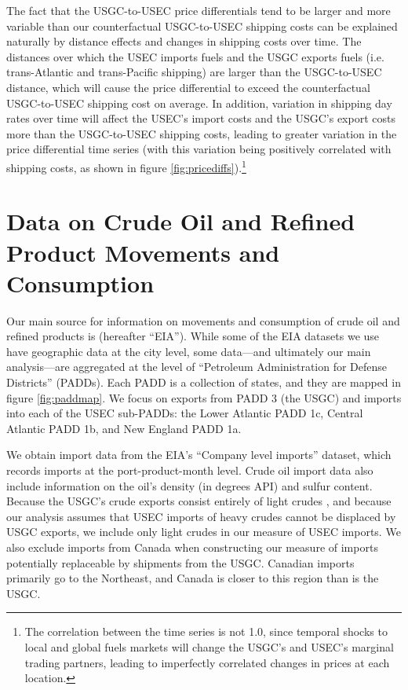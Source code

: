 \documentclass[12pt]{article}
\begin{document}
The fact that the USGC-to-USEC price differentials tend to be larger and more variable than our counterfactual USGC-to-USEC shipping costs can be explained naturally by distance effects and changes in shipping costs over time. The distances over which the USEC imports fuels and the USGC exports fuels (i.e. trans-Atlantic and trans-Pacific shipping) are larger than the USGC-to-USEC distance, which will cause the price differential to exceed the counterfactual USGC-to-USEC shipping cost on average. In addition, variation in shipping day rates over time will affect the USEC’s import costs and the USGC’s export costs more than the USGC-to-USEC shipping costs, leading to greater variation in the price differential time series (with this variation being positively correlated with shipping costs, as shown in figure \ref{fig:pricediffs}).\footnote{The correlation between the time series is not 1.0, since temporal shocks to local and global fuels markets will change the USGC’s and USEC’s marginal trading partners, leading to imperfectly correlated changes in prices at each location.}


\section{Data on Crude Oil and Refined Product Movements and Consumption \label{sec:flowdata}}

Our main source for information on movements and consumption of crude oil and refined products is \citet{EIApetroleum} (hereafter ``EIA''). While some of the EIA datasets we use have geographic data at the city level, some data---and ultimately our main analysis---are aggregated at the level of ``Petroleum Administration for Defense Districts'' (PADDs). Each PADD is a collection of states, and they are mapped in figure \ref{fig:paddmap}. We focus on exports from PADD 3 (the USGC) and imports into each of the USEC sub-PADDs: the Lower Atlantic PADD 1c, Central Atlantic PADD 1b, and New England PADD 1a.

We obtain import data from the EIA's ``Company level imports'' dataset, which records imports at the port-product-month level. Crude oil import data also include information on the oil's density (in degrees API) and sulfur content. Because the USGC's crude exports consist entirely of light crudes \citep{SPglobal_exports_2018}, and because our analysis assumes that USEC imports of heavy crudes cannot be displaced by USGC exports, we include only light crudes in our measure of USEC imports. We also exclude imports from Canada when constructing our measure of imports potentially replaceable by shipments from the USGC. Canadian imports primarily go to the Northeast, and Canada is closer to this region than is the USGC. 
\end{document}
